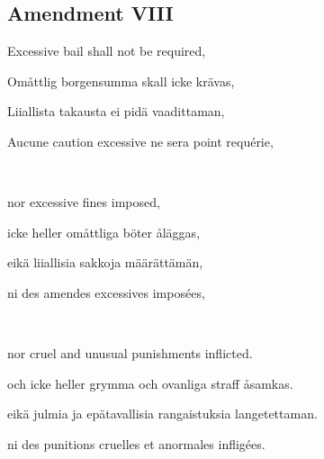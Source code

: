 \documentclass[a4paper,landscape,12pt]{article}
\begin{document}
\subsection*{Amendment VIII}
\begin{minipage}[t]{0.22\textwidth}
Excessive bail shall not be required,
\end{minipage}\textwidth
\begin{minipage}[t]{0.22\textwidth}
Omåttlig borgensumma skall icke krävas,
\end{minipage}\textwidth
\begin{minipage}[t]{0.22\textwidth}
Liiallista takausta ei pidä vaadittaman,
\end{minipage}\textwidth
\begin{minipage}[t]{0.22\textwidth}
Aucune caution excessive ne sera point requérie,
\end{minipage}

~

\begin{minipage}[t]{0.22\textwidth}
nor excessive fines imposed,
\end{minipage}\textwidth
\begin{minipage}[t]{0.22\textwidth}
icke heller omåttliga böter åläggas,
\end{minipage}\textwidth
\begin{minipage}[t]{0.22\textwidth}
eikä liiallisia sakkoja määrättämän,
\end{minipage}\textwidth
\begin{minipage}[t]{0.22\textwidth}
ni des amendes excessives imposées,
\end{minipage}

~

\begin{minipage}[t]{0.22\textwidth}
nor cruel and unusual punishments inflicted.
\end{minipage}\textwidth
\begin{minipage}[t]{0.22\textwidth}
och icke heller grymma och ovanliga straff åsamkas.
\end{minipage}\textwidth
\begin{minipage}[t]{0.22\textwidth}
eikä julmia ja epätavallisia rangaistuksia langetettaman.
\end{minipage}\textwidth
\begin{minipage}[t]{0.22\textwidth}
ni des punitions cruelles et anormales infligées.
\end{minipage}
\end{document}
